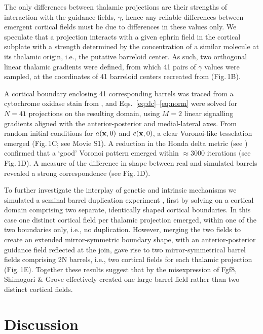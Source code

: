 \documentclass[9pt,lineno]{elife}
\begin{document}
The only differences between thalamic projections are their strengths of
interaction with the guidance fields, $\gamma$, hence any reliable differences
between emergent cortical fields must be due to differences in these values
only. We speculate that a projection interacts with a given ephrin field in
the cortical subplate with a strength determined by the concentration of a
similar molecule at its thalamic origin, i.e., the putative barreloid
center. As such, two orthogonal linear thalamic gradients were defined, from
which 41 pairs of $\gamma$ values were sampled, at the coordinates of 41
barreloid centers recreated from \cite{haidarliu_size_2001} (Fig.\,1B).

A cortical boundary enclosing 41 corresponding barrels was traced from a
cytochrome oxidase stain from \cite{zheng_signal_2001}, and
Eqs.~\ref{eq:dc}--\ref{eq:norm} were solved for $N=41$ projections on the
resulting domain, using $M=2$ linear signalling gradients aligned with the
anterior-posterior and medial-lateral axes. From random initial conditions for
$a({\bf x},0)$ and $c({\bf x},0)$, a clear Voronoi-like tesselation emerged
(Fig.\,1C; see Movie S1). A reduction in the Honda delta metric (see
\cite{senft_mouse_1991}) confirmed that a `good' Voronoi pattern emerged
within $\approx 3000$ iterations (see Fig.\,1D). A measure of the difference
in shape between real and simulated barrels revealed a strong correspondence
(see Fig.\,1D).

To further investigate the interplay of genetic and intrinsic mechanisms we
simulated a seminal barrel duplication experiment
\cite{shimogori_fibroblast_2005}, first by solving on a cortical domain
comprising two separate, identically shaped cortical boundaries. In this case
one distinct cortical field per thalamic projection emerged, within one of the
two boundaries only, i.e., no duplication. However, merging the two fields to
create an extended mirror-symmetric boundary shape, with an anterior-posterior
guidance field reflected at the join, gave rise to two mirror-symmetrical
barrel fields comprising 2N barrels, i.e., two cortical fields for each
thalamic projection (Fig.\,1E). Together these results suggest that by the
misexpression of Fgf8, Shimogori \& Grove \citep{shimogori_fibroblast_2005}
effectively created one large barrel field rather than two distinct cortical
fields.

\section{Discussion}
\end{document}
